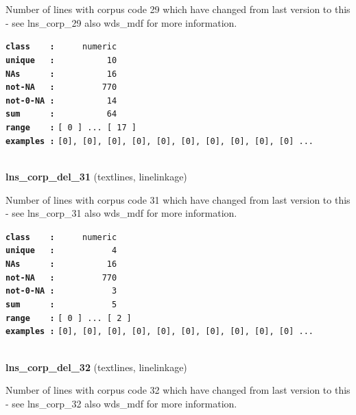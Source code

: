 \documentclass[]{article}
\begin{document}
Number of lines with corpus code 29 which have changed from last version
to this - see lns\_corp\_29 also wds\_mdf for more information.

\textbf{\texttt{class\ \ \ \ :}} \texttt{~~~~~numeric}\\
\textbf{\texttt{unique\ \ \ :}} \texttt{~~~~~~~~~~10}\\
\textbf{\texttt{NAs\ \ \ \ \ \ :}} \texttt{~~~~~~~~~~16}\\
\textbf{\texttt{not-NA\ \ \ :}} \texttt{~~~~~~~~~770}\\
\textbf{\texttt{not-0-NA\ :}} \texttt{~~~~~~~~~~14}\\
\textbf{\texttt{sum\ \ \ \ \ \ :}} \texttt{~~~~~~~~~~64}\\
\textbf{\texttt{range\ \ \ \ :}}
\texttt{{[}\ 0\ {]}\ ...\ {[}\ 17\ {]}}\\
\textbf{\texttt{examples\ :}}
\texttt{{[}0{]},\ {[}0{]},\ {[}0{]},\ {[}0{]},\ {[}0{]},\ {[}0{]},\ {[}0{]},\ {[}0{]},\ {[}0{]},\ {[}0{]}\ ...}\\

~

\textbf{lns\_corp\_del\_31} (textlines, linelinkage)

Number of lines with corpus code 31 which have changed from last version
to this - see lns\_corp\_31 also wds\_mdf for more information.

\textbf{\texttt{class\ \ \ \ :}} \texttt{~~~~~numeric}\\
\textbf{\texttt{unique\ \ \ :}} \texttt{~~~~~~~~~~~4}\\
\textbf{\texttt{NAs\ \ \ \ \ \ :}} \texttt{~~~~~~~~~~16}\\
\textbf{\texttt{not-NA\ \ \ :}} \texttt{~~~~~~~~~770}\\
\textbf{\texttt{not-0-NA\ :}} \texttt{~~~~~~~~~~~3}\\
\textbf{\texttt{sum\ \ \ \ \ \ :}} \texttt{~~~~~~~~~~~5}\\
\textbf{\texttt{range\ \ \ \ :}}
\texttt{{[}\ 0\ {]}\ ...\ {[}\ 2\ {]}}\\
\textbf{\texttt{examples\ :}}
\texttt{{[}0{]},\ {[}0{]},\ {[}0{]},\ {[}0{]},\ {[}0{]},\ {[}0{]},\ {[}0{]},\ {[}0{]},\ {[}0{]},\ {[}0{]}\ ...}\\

~

\textbf{lns\_corp\_del\_32} (textlines, linelinkage)

Number of lines with corpus code 32 which have changed from last version
to this - see lns\_corp\_32 also wds\_mdf for more information.
\end{document}
